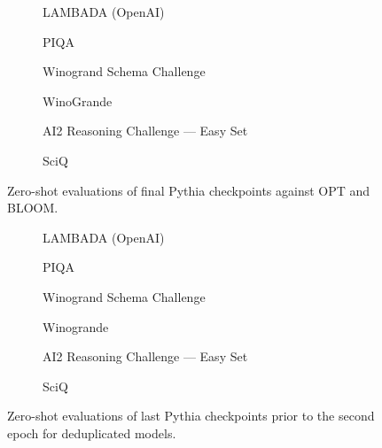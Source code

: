 \documentclass{article}
\theoremstyle{plain}
\theoremstyle{definition}
\theoremstyle{remark}
\begin{document}
\begin{figure}[h!]
\centering
\begin{subfigure}{0.45\columnwidth}
\centering
{}
\caption{LAMBADA (OpenAI)}
\end{subfigure}
\begin{subfigure}{0.45\columnwidth}
\centering
{}
\caption{PIQA}
\end{subfigure}
\begin{subfigure}{0.45\columnwidth}
\centering
{}
\caption{Winogrand Schema Challenge}
\end{subfigure}
\begin{subfigure}{0.45\columnwidth}
\centering
{}
\caption{WinoGrande}
\end{subfigure}
\begin{subfigure}{0.45\columnwidth}
\centering
{}
\caption{AI2 Reasoning Challenge --- Easy Set}
\end{subfigure}
\begin{subfigure}{0.45\columnwidth}
\centering
{}
\caption{SciQ}
\end{subfigure}
\caption{Zero-shot evaluations of final Pythia checkpoints against OPT and BLOOM.}
\end{figure}

\begin{figure}[h]
\centering
\begin{subfigure}{0.45\columnwidth}
\centering
{}
\caption{LAMBADA (OpenAI)}
\end{subfigure}
\begin{subfigure}{0.45\columnwidth}
\centering
{}
\caption{PIQA}
\end{subfigure}
\begin{subfigure}{0.45\columnwidth}
\centering
{}
\caption{Winogrand Schema Challenge}
\end{subfigure}
\begin{subfigure}{0.45\columnwidth}
\centering
{}
\caption{Winogrande}
\end{subfigure}
\begin{subfigure}{0.45\columnwidth}
\centering
{}
\caption{AI2 Reasoning Challenge --- Easy Set}
\end{subfigure}
\begin{subfigure}{0.45\columnwidth}
\centering
{}
\caption{SciQ}
\end{subfigure}
\caption{Zero-shot evaluations of last Pythia checkpoints prior to the second epoch for deduplicated models.}
\end{figure}
\end{document}
